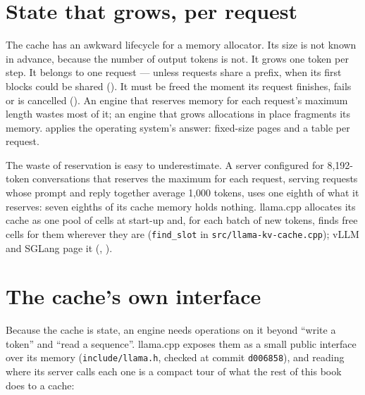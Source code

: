 \section{State that grows, per request}

The cache has an awkward lifecycle for a memory allocator. Its size is not
known in advance, because the number of output tokens is not. It grows one
token per step. It belongs to one request --- unless requests share a prefix,
when its first blocks could be shared (). It must be freed
the moment its request finishes, fails or is cancelled
(). An engine that reserves memory for each request's
maximum length wastes most of it; an engine that grows allocations in place
fragments its memory.  applies the operating system's answer:
fixed-size pages and a table per request.

The waste of reservation is easy to underestimate. A server configured for
8,192-token conversations that reserves the maximum for each request, serving
requests whose prompt and reply together average 1,000 tokens, uses one eighth
of what it reserves: seven eighths of its cache memory holds nothing. llama.cpp
allocates its cache as one pool of cells at start-up and, for each batch of new
tokens, finds free cells for them wherever they are (\texttt{find\_slot} in
\texttt{src/llama-kv-cache.cpp}); vLLM and SGLang page it (,
).

\section{The cache's own interface}

Because the cache is state, an engine needs operations on it beyond ``write a
token'' and ``read a sequence''. llama.cpp exposes them as a small public
interface over its memory (\texttt{include/llama.h}, checked at commit
\texttt{d006858}), and reading where its server calls each one is a compact
tour of what the rest of this book does to a cache:

